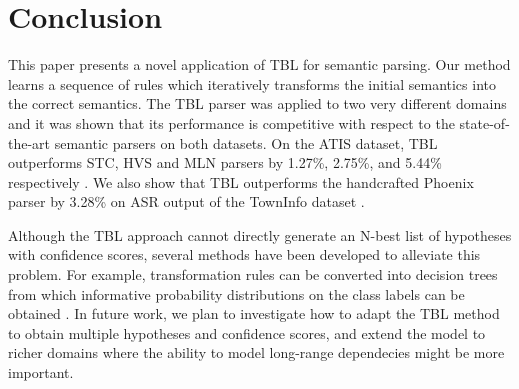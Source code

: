 \documentclass{article}
\begin{document}
\section{Conclusion} \label{sec:conlusion}

This paper presents a novel application of TBL for semantic parsing. Our method learns a sequence of rules which iteratively transforms the initial semantics into the correct semantics.
The TBL parser was applied to two very different domains and it was shown that its performance is competitive with respect to the state-of-the-art semantic parsers on both datasets. 
On the ATIS dataset, TBL outperforms STC, HVS and MLN parsers by 1.27\%, 2.75\%, and 5.44\% respectively \cite{mairesse09,he05,meza08b}. We also show that TBL outperforms the handcrafted Phoenix parser by 3.28\% on ASR output of the TownInfo dataset \cite{mairesse09}.

Although the TBL approach cannot directly generate an N-best list of hypotheses with confidence scores, several methods have been developed to alleviate this problem. For example, transformation rules can be converted into decision trees from which informative probability distributions on the class labels can be obtained \cite{florian00}. In future work, we plan to investigate how to adapt the TBL method to obtain multiple hypotheses and confidence scores, and extend the model to richer domains where the ability to model long-range dependecies might be more important.


\eightpt


\end{document}
